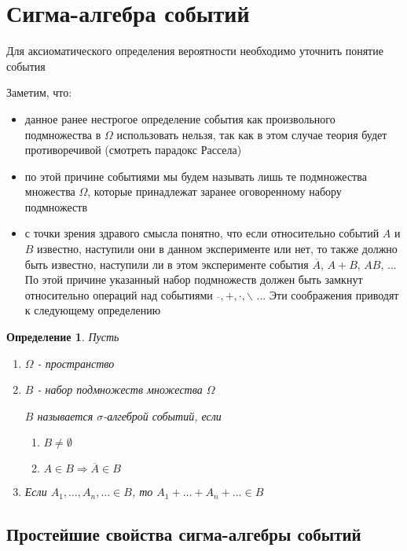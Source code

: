\documentclass[a4paper, 14pt]{report}
\newtheorem{defenition}{Определение}[section]
\begin{document}
\section{Сигма-алгебра событий}

Для аксиоматического определения вероятности необходимо уточнить понятие события

Заметим, что:

\begin{itemize}
    \item данное ранее нестрогое определение события как произвольного подмножества в $\Omega$ использовать нельзя, так как в этом случае теория будет противоречивой (смотреть парадокс Рассела)
    \item по этой причине событиями мы будем называть лишь те подмножества множества $\Omega$, которые принадлежат заранее оговоренному набору подмножеств
    \item с точки зрения здравого смысла понятно, что если относительно событий $A$ и $B$ известно, наступили они в данном эксперименте или нет, то также должно быть известно, наступили ли в этом эксперименте события $\overline{A}$, $A+B$, $AB$, ... По этой причине указанный набор подмножеств должен быть замкнут относительно операций над событиями $\overline{}, +, \cdot, \backslash$ ... Эти соображения приводят к следующему определению
\end{itemize}

\begin{defenition}
    Пусть
    \begin{enumerate}
        \item $\Omega$ - пространство 
        \item $B$ - набор подмножеств множества $\Omega$

            $B$ называется $\sigma$-алгеброй событий, если
            \begin{enumerate}
                \item $B \ne \emptyset$
                \item $A \in B \Rightarrow \overline{A} \in B$
            \end{enumerate}

        \item Если $A_1, \dots, A_n, \dots \in B$, то $A_1 + \dots + A_n + \dots \in B$
    \end{enumerate}
\end{defenition}

\subsection{Простейшие свойства сигма-алгебры событий}
\end{document}

